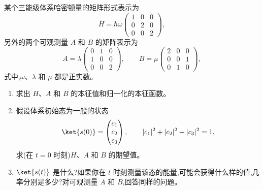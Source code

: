 \begin{question}
某个三能级体系哈密顿量的矩阵形式表示为
\[
H=\hbar\omega\begin{pmatrix}
1&0&0\\
0&2&0\\
0&0&2
\end{pmatrix},
\]
另外的两个可观测量 $A$ 和 $B$ 的矩阵表示为
\[
A=\lambda\begin{pmatrix}
0&1&0\\
1&0&0\\
0&0&2
\end{pmatrix},
\qquad
B=\mu\begin{pmatrix}
2&0&0\\
0&0&1\\
0&1&0
\end{pmatrix},
\]
式中,$\omega$、$\lambda$ 和 $\mu$ 都是正实数。
\begin{enumerate}
\item 求出 $H$、$A$ 和 $B$ 的本征值和归一化的本征函数。
\item 假设体系初始态为一般的状态
\[
\ket{s(0)}=\begin{pmatrix}c_1\\c_2\\c_3\end{pmatrix},
\qquad |c_1|^2+|c_2|^2+|c_3|^2=1,
\]
求(在 $t=0$ 时刻)$H$、$A$ 和 $B$ 的期望值。
\item $\ket{s(t)}$ 是什么?如果你在 $t$ 时刻测量该态的能量,可能会获得什么样的值,几率分别是多少?对可观测量 $A$ 和 $B$,回答同样的问题。
\end{enumerate}
\end{question}

